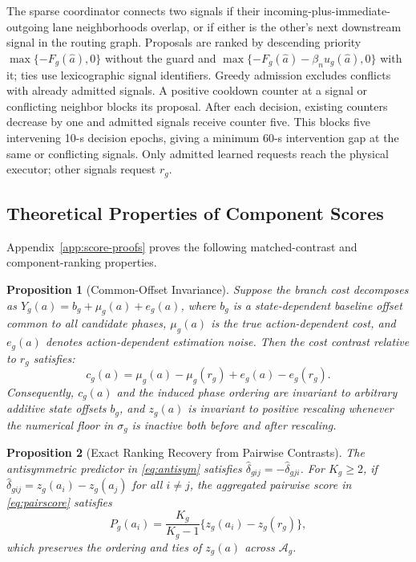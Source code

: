 \documentclass[letterpaper,journal]{IEEEtran}
\newtheorem{proposition}{Proposition}
\begin{document}
The sparse coordinator connects two signals if their incoming-plus-immediate-outgoing lane neighborhoods overlap, or if either is the other's next downstream signal in the routing graph. Proposals are ranked by descending priority $\max\{-F_g(\widehat a),0\}$ without the guard and $\max\{-F_g(\widehat a)-\beta_nu_g(\widehat a),0\}$ with it; ties use lexicographic signal identifiers. Greedy admission excludes conflicts with already admitted signals. A positive cooldown counter at a signal or conflicting neighbor blocks its proposal. After each decision, existing counters decrease by one and admitted signals receive counter five. This blocks five intervening 10-s decision epochs, giving a minimum 60-s intervention gap at the same or conflicting signals. Only admitted learned requests reach the physical executor; other signals request $r_g$.

\subsection{Theoretical Properties of Component Scores}
Appendix~\ref{app:score-proofs} proves the following matched-contrast and component-ranking properties.

\begin{proposition}[Common-Offset Invariance]
\label{prop:offset}
Suppose the branch cost decomposes as $Y_g(a)=b_g+\mu_g(a)+e_g(a)$, where $b_g$ is a state-dependent baseline offset common to all candidate phases, $\mu_g(a)$ is the true action-dependent cost, and $e_g(a)$ denotes action-dependent estimation noise. Then the cost contrast relative to $r_g$ satisfies:
\begin{equation}
 c_g(a)=\mu_g(a)-\mu_g(r_g)+e_g(a)-e_g(r_g).
 \label{eq:cancellation}
\end{equation}
Consequently, $c_g(a)$ and the induced phase ordering are invariant to arbitrary additive state offsets $b_g$, and $z_g(a)$ is invariant to positive rescaling whenever the numerical floor in $\sigma_g$ is inactive both before and after rescaling.
\end{proposition}

\begin{proposition}[Exact Ranking Recovery from Pairwise Contrasts]
\label{prop:pair-recovery}
The antisymmetric predictor in \eqref{eq:antisym} satisfies $\widehat\delta_{gij}=-\widehat\delta_{gji}$. For $K_g\geq2$, if $\widehat\delta_{gij}=z_g(a_i)-z_g(a_j)$ for all $i\ne j$, the aggregated pairwise score in \eqref{eq:pairscore} satisfies
\begin{equation}
 P_g(a_i)=\frac{K_g}{K_g-1}\{z_g(a_i)-z_g(r_g)\},
 \label{eq:recovery}
\end{equation}
which preserves the ordering and ties of $z_g(a)$ across $\mathcal A_g$.
\end{proposition}
\end{document}
